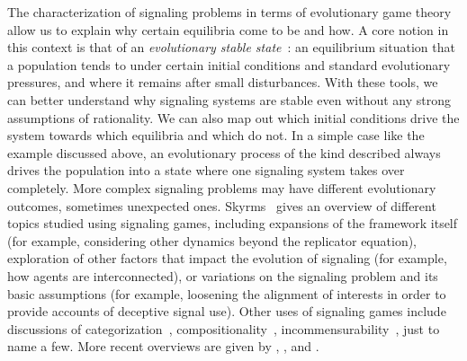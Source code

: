 \documentclass[a4paper]{article}
\begin{document}
The characterization of signaling problems in terms of evolutionary game theory allow us to explain why certain equilibria come to be and how.
A core notion in this context is that of an \emph{evolutionary stable state}~\parencite{maynard_smith_evolution_1982}: an equilibrium situation that a population tends to under certain initial conditions and standard evolutionary pressures, and where it remains after small disturbances.
With these tools, we can better understand why signaling systems are stable even without any strong assumptions of rationality.
We can also map out which initial conditions drive the system towards which equilibria and which do not.
In a simple case like the example discussed above, an evolutionary process of the kind described always drives the population into a state where one signaling system takes over completely. %
More complex signaling problems may have different evolutionary outcomes, sometimes unexpected ones.
Skyrms~\parencite*{skyrms_signals_2010} gives an overview of different topics studied using signaling games, including expansions of the framework itself (for example, considering other dynamics beyond the replicator equation), exploration of other factors that impact the evolution of signaling (for example, how agents are interconnected), or variations on the signaling problem and its basic assumptions (for example, loosening the alignment of interests in order to provide accounts of deceptive signal use).
Other uses of signaling games include discussions of categorization~\parencite[\emph{e.g.}][]{jager_language_2007}, compositionality~\parencite[\emph{e.g.}][]{barrett_evolution_2009}, incommensurability~\parencite[\emph{e.g.}][]{barrett_faithful_2010}, just to name a few.
More recent overviews are given by \textcites{huttegger_how_2014}, \textcite{huttegger_dynamics_2014}, and \citet{FrankeWagner2014:Game-Theory-and}.

%
\end{document}
